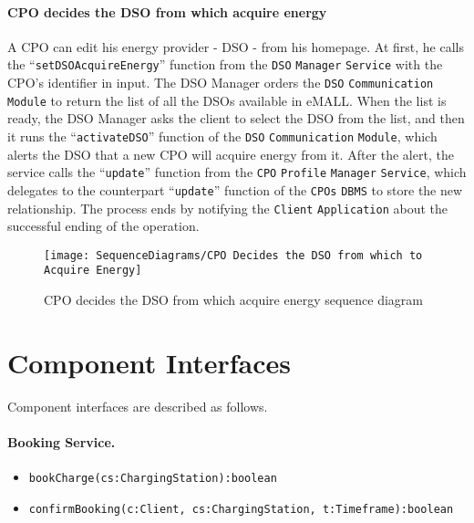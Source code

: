 \paragraph{CPO decides the DSO from which acquire energy}
A CPO can edit his energy provider - DSO - from his homepage.
At first, he calls the ``\verb|setDSOAcquireEnergy|'' function from the \verb|DSO| \verb|Manager| \verb|Service| with the CPO's identifier in input.
The DSO Manager orders the \verb|DSO| \verb|Communication| \verb|Module| to return the list of all the DSOs available in eMALL\@.
When the list is ready, the DSO Manager asks the client to select the DSO from the list, and then it runs the ``\verb|activateDSO|'' function of the \verb|DSO| \verb|Communication| \verb|Module|, which alerts the DSO that a new CPO will acquire energy from it.
After the alert, the service calls the ``\verb|update|'' function from the \verb|CPO| \verb|Profile| \verb|Manager| \verb|Service|, which delegates to the counterpart ``\verb|update|'' function of the \verb|CPOs| \verb|DBMS| to store the new relationship.
The process ends by notifying the \verb|Client| \verb|Application| about the successful ending of the operation.
\begin{figure}[H]
    \begin{center}
        \texttt{[image: SequenceDiagrams/CPO Decides the DSO from which to Acquire Energy]}
        \caption{CPO decides the DSO from which acquire energy sequence diagram}
        \label{cpo_decides_dso_from_which_acquire_energy}
    \end{center}
\end{figure}

\newpage


\section{Component Interfaces}
\label{sec: component_interfaces}%
Component interfaces are described as follows.

\paragraph{Booking Service.}
\begin{itemize}
    \item \verb|bookCharge(cs:ChargingStation):boolean|
    \item \verb|confirmBooking(c:Client, cs:ChargingStation, t:Timeframe):boolean|
\end{itemize}

